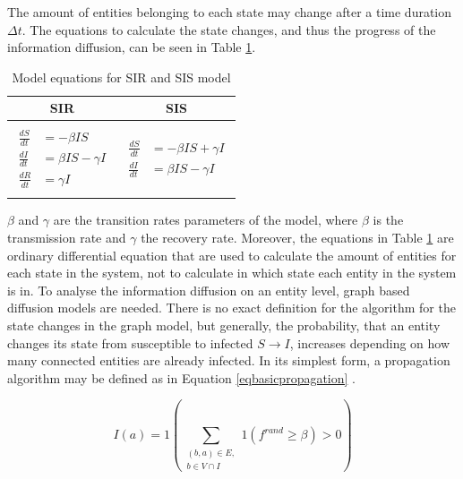 The amount of entities belonging to each state may change 
after a time duration $\Delta t$. The equations to calculate the 
state changes, and thus the progress of the information diffusion, 
can be seen in Table \ref{SI-table-equations}.

\begin{table}[ht!]
    \centering
    \begin{tabular}{|c | c |} 
     \hline
     SIR & SIS  \\ 
     \hline
     & \\
     $\begin{aligned}
          \frac{dS}{dt} &= -\beta I S \\
          \frac{dI}{dt} &= \beta I S - \gamma I \\
          \frac{dR}{dt} &= \gamma I  
        \end{aligned}$
      &
      $\begin{aligned}
          \frac{dS}{dt} &= -\beta I S + \gamma I\\
          \frac{dI}{dt} &= \beta I S - \gamma I
        \end{aligned}$
       \\ 
       & \\
     \hline
    \end{tabular}
    \caption{Model equations for SIR and SIS model \cite{sirequation}}
    \label{SI-table-equations}
\end{table}

$\beta$ and $\gamma$ are the transition rates parameters of the model, where 
$\beta$ is the transmission rate and $\gamma$ the 
recovery rate. Moreover, the equations in Table \ref{SI-table-equations}
are ordinary differential equation that are used to calculate the amount
of entities for each state in the system, not to calculate in which state
each entity in the system is in. To analyse the information diffusion on 
an entity level, graph based diffusion models are needed.
There is no exact definition for the algorithm for the state changes in the
graph model, but generally, the probability, that an entity changes
its state from susceptible to infected $S \to I$, increases depending on
how many connected entities are already infected. In its simplest form, a
propagation algorithm may be defined as in Equation \ref{eqbasicpropagation} 
\cite{easypropagation}.

\begin{equation}
    I(a) = 1 (\sum\limits_{\substack{(b,a)\in E, \\ b \in V \cap I}}
    1(f^{rand}\geq \beta)>0) 
    \label{eqbasicpropagation}
\end{equation}

